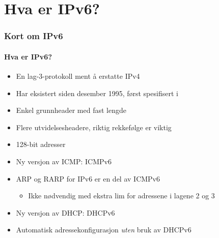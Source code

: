 \section{Hva er IPv6?}
\begin{frame}%
  \frametitle{Kort om IPv6}
  \framesubtitle{Hva er IPv6?}
  \pause
  \begin{itemize}[<+->]
  \item En lag-3-protokoll ment å erstatte IPv4
  \item Har eksistert siden desember 1995, først spesifisert i 
  \item Enkel grunnheader med fast lengde
  \item Flere utvidelsesheadere, riktig rekkefølge er viktig
  \item \alert<12>{128-bit adresser}
  \item Ny versjon av ICMP: ICMPv6
  \item ARP og RARP for IPv6 er en del av ICMPv6
    \begin{itemize}[<+->]
    \item Ikke nødvendig med ekstra lim for adressene i lagene 2 og 3
    \end{itemize}
  \item Ny versjon av DHCP: DHCPv6
  \item \alert<12>{Automatisk adressekonfigurasjon \textit{uten\/} bruk av DHCPv6}
  \end{itemize}
\end{frame}

